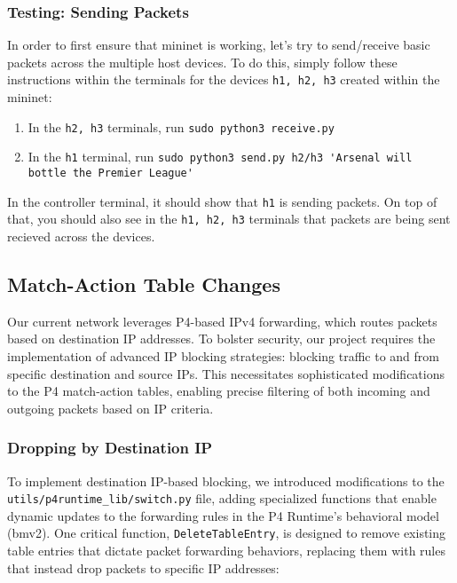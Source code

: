 \subsubsection{Testing: Sending Packets}
In order to first ensure that mininet is working, let's try to send/receive basic packets across the multiple host devices. To do this, simply follow these instructions within the terminals for the devices \verb|h1, h2, h3| created within the mininet:
\begin{enumerate}
    \item In the \verb|h2, h3| terminals, run \verb|sudo python3 receive.py|
    \item In the \verb|h1| terminal, run \verb|sudo python3 send.py h2/h3 'Arsenal will bottle the Premier League'|
\end{enumerate}
In the controller terminal, it should show that \verb|h1| is sending packets. On top of that, you should also see in the \verb|h1, h2, h3| terminals that packets are being sent recieved across the devices.
\subsection{Match-Action Table Changes}
Our current network leverages P4-based IPv4 forwarding, which routes packets based on destination IP addresses. To bolster security, our project requires the implementation of advanced IP blocking strategies: blocking traffic to and from specific destination and source IPs. This necessitates sophisticated modifications to the P4 match-action tables, enabling precise filtering of both incoming and outgoing packets based on IP criteria. 
\subsubsection{Dropping by Destination IP}
To implement destination IP-based blocking, we introduced modifications to the \verb|utils/p4runtime_lib/|\verb|switch.py| file, adding specialized functions that enable dynamic updates to the forwarding rules in the P4 Runtime's behavioral model (bmv2). One critical function, \verb|DeleteTableEntry|, is designed to remove existing table entries that dictate packet forwarding behaviors, replacing them with rules that instead drop packets to specific IP addresses:

